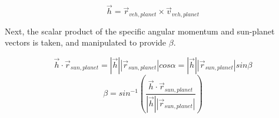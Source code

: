\begin{equation*}
\vec{h} = \vec{r}_{veh,planet} \times \vec{v}_{veh,planet}
\end{equation*}

Next, the scalar product of the specific angular momentum and sun-planet vectors is taken, and manipulated to provide $\beta$.

\begin{equation*}
\vec{h} \cdot \vec{r}_{sun,planet} = \left|\vec{h}\right|\left|\vec{r}_{sun,planet}\right|cos\alpha = \left|\vec{h}\right|\left|\vec{r}_{sun,planet}\right| sin\beta
\end{equation*}
\begin{equation}
\beta = sin^{-1} \left( \frac{\vec{h} \cdot \vec{r}_{sun,planet}}{\left|\vec{h}\right|\left|\vec{r}_{sun,planet}\right|} \right)
\end{equation}
